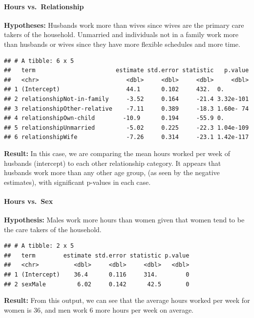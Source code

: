 \documentclass[]{article}
\let\oldparagraph\paragraph
\renewcommand{\paragraph}[1]{\oldparagraph{#1}\mbox{}}
\begin{document}
\hypertarget{hours-vs.relationship}{%
\paragraph{Hours vs.~Relationship}\label{hours-vs.relationship}}

\textbf{Hypotheses:} Husbands work more than wives since wives are the
primary care takers of the household. Unmarried and individuals not in a
family work more than husbands or wives since they have more flexible
schedules and more time.

\begin{verbatim}
## # A tibble: 6 x 5
##   term                       estimate std.error statistic   p.value
##   <chr>                         <dbl>     <dbl>     <dbl>     <dbl>
## 1 (Intercept)                   44.1      0.102     432.  0.       
## 2 relationshipNot-in-family     -3.52     0.164     -21.4 3.32e-101
## 3 relationshipOther-relative    -7.11     0.389     -18.3 1.60e- 74
## 4 relationshipOwn-child        -10.9      0.194     -55.9 0.       
## 5 relationshipUnmarried         -5.02     0.225     -22.3 1.04e-109
## 6 relationshipWife              -7.26     0.314     -23.1 1.42e-117
\end{verbatim}

\textbf{Result:} In this case, we are comparing the mean hours worked
per week of husbands (intercept) to each other relationship category. It
appears that husbands work more than any other age group, (as seen by
the negative estimates), with significant p-values in each case.

\hypertarget{hours-vs.sex}{%
\paragraph{Hours vs.~Sex}\label{hours-vs.sex}}

\textbf{Hypothesis:} Males work more hours than women given that women
tend to be the care takers of the household.

\begin{verbatim}
## # A tibble: 2 x 5
##   term        estimate std.error statistic p.value
##   <chr>          <dbl>     <dbl>     <dbl>   <dbl>
## 1 (Intercept)    36.4      0.116     314.        0
## 2 sexMale         6.02     0.142      42.5       0
\end{verbatim}

\textbf{Result:} From this output, we can see that the average hours
worked per week for women is 36, and men work 6 more hours per week on
average.
\end{document}
